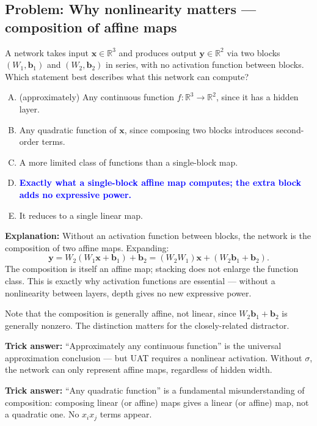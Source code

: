 \documentclass[12pt]{amsart}
\begin{document}
\subsection*{Problem: Why nonlinearity matters --- composition of affine maps}

A network takes input $\mathbf{x} \in \mathbb{R}^3$ and produces output
$\mathbf{y} \in \mathbb{R}^2$ via two blocks $(W_1, \mathbf{b}_1)$ and
$(W_2, \mathbf{b}_2)$ in series, with no activation function between blocks.
Which statement best describes what this network can compute?

\begin{enumerate}[(A)]
\item (approximately) Any continuous function $f:\mathbb{R}^3 \to \mathbb{R}^2$,
since it has a hidden layer.
\item Any quadratic function of $\mathbf{x}$, since composing two blocks
introduces second-order terms.
\item A more limited class of functions than a single-block map.
\item \textcolor{blue}{\textbf{Exactly what a single-block affine map computes; the extra block adds no expressive power.}}
\item It reduces to a single linear map.
\end{enumerate}

\textbf{Explanation:}
Without an activation function between blocks, the network is the composition
of two affine maps. Expanding:
$$\mathbf{y} = W_2(W_1\mathbf{x} + \mathbf{b}_1) + \mathbf{b}_2
= (W_2W_1)\mathbf{x} + (W_2\mathbf{b}_1 + \mathbf{b}_2).$$
The composition is itself an affine map; stacking does not enlarge the
function class. This is exactly why activation functions are essential ---
without a nonlinearity between layers, depth gives no new expressive power.

Note that the composition is generally affine, not linear, since
$W_2\mathbf{b}_1 + \mathbf{b}_2$ is generally nonzero. The distinction matters
for the closely-related distractor.

\textbf{Trick answer:}
``Approximately any continuous function'' is the universal approximation
conclusion --- but UAT requires a nonlinear activation. Without $\sigma$,
the network can only represent affine maps, regardless of hidden width.

\textbf{Trick answer:}
``Any quadratic function'' is a fundamental misunderstanding of composition:
composing linear (or affine) maps gives a linear (or affine) map, not a
quadratic one. No $x_i x_j$ terms appear.
\end{document}
